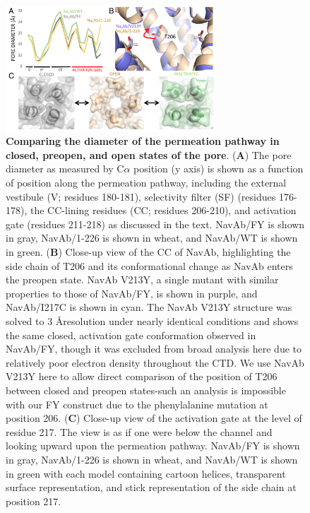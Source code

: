 \begin{refsection}
{\begin{figure}[!htb]
\centering
\includegraphics[width=0.7\textwidth]{navopen/NavOFig8}
\caption[Comparing the diameter of the permeation pathway in closed, preopen, and open states of the pore]{\textbf{Comparing the diameter of the permeation pathway in closed, preopen, and open states of the pore}. (\textbf{A}) The pore diameter as measured by C$\alpha$ position (y axis) is shown as a function of position along the permeation pathway, including the external vestibule (V; residues 180-181), selectivity filter (SF) (residues 176-178), the CC-lining residues (CC; residues 206-210), and activation gate (residues 211-218) as discussed in the text. NavAb/FY is shown in gray, NavAb/1-226 is shown in wheat, and NavAb/WT is shown in green. (\textbf{B}) Close-up view of the CC of NavAb, highlighting the side chain of T206 and its conformational change as NavAb enters the preopen state. NavAb V213Y, a single mutant with similar properties to those of NavAb/FY, is shown in purple, and NavAb/I217C is shown in cyan. The NavAb V213Y structure was solved to 3 \AA resolution under nearly identical conditions and shows the same closed, activation gate conformation observed in NavAb/FY, though it was excluded from broad analysis here due to relatively poor electron density throughout the CTD. We use NavAb V213Y here to allow direct comparison of the position of T206 between closed and preopen states-such an analysis is impossible with our FY construct due to the phenylalanine mutation at position 206. (\textbf{C}) Close-up view of the activation gate at the level of residue 217. The view is as if one were below the channel and looking upward upon the permeation pathway. NavAb/FY is shown in gray, NavAb/1-226 is shown in wheat, and NavAb/WT is shown in green \textemdash with each model containing cartoon helices, transparent surface representation, and stick representation of the side chain at position 217.}
\label{fig:navofig8}
\end{figure}

}
\end{refsection}
